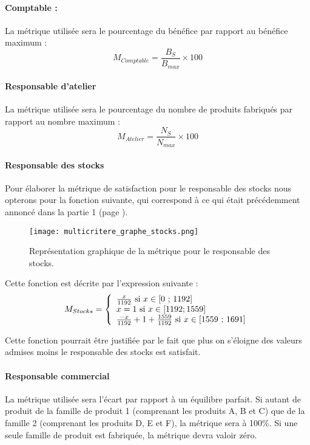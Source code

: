\paragraph{Comptable :}
La métrique utilisée sera le pourcentage du bénéfice par rapport au bénéfice
maximum :
$$
M_{Comptable} = \frac{B_{S}}{B_{max}} \times 100
$$

\paragraph{Responsable d'atelier}
La métrique utilisée sera le pourcentage du nombre de produits fabriqués par
rapport au nombre maximum :
$$
M_{Atelier} = \frac{N_{S}}{N_{max}} \times 100
$$

\paragraph{Responsable des stocks}
Pour élaborer la métrique de satisfaction pour le responsable des stocks nous
opterons pour la fonction suivante, qui correspond à ce qui était précédemment
annoncé dans la partie 1 (page \pageref{stocks}).

\begin{figure}[!ht]
\begin{center}
    \texttt{[image: multicritere\_graphe\_stocks.png]}
    \caption{Représentation graphique de la métrique pour le responsable des
	stocks.}
	\end{center}
\end{figure}

Cette fonction est décrite par l'expression suivante :
$$
M_{Stocks} = \left\{ 
    \begin{array}{l l l}
	\frac{x}{1192} \text{ si } x \in \text{[0 ; 1192]} \\
	x=1 \text{ si } x \in [1192 ; 1559]\\
	\frac{-x}{1192}+ 1+\frac{1559}{1192} \text{ si } x \in \text{[1559 ;
	    1691]}\\
    \end{array}
\right.
$$

Cette fonction pourrait être justifiée par le fait que plus on s’éloigne des
valeurs admises moins le responsable des stocks est satisfait.


\paragraph{Responsable commercial}
La métrique utilisée sera l'écart par rapport à un équilibre parfait.
Si autant de produit de la famille de produit 1 (comprenant les produits A, B
et C) que de la famille 2 (comprenant les produits D, E et F), la métrique sera
à 100\%.
Si une seule famille de produit est fabriquée, la métrique devra valoir zéro.


